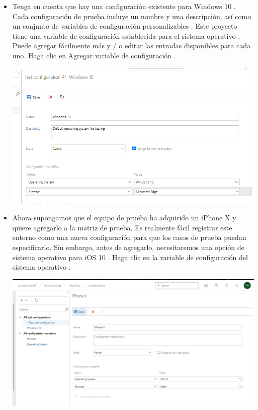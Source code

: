 \begin{itemize}
\item Tenga en cuenta que hay una configuración existente para Windows 10 . Cada configuración de prueba incluye un nombre y una descripción, así como un conjunto de variables de configuración personalizables . Este proyecto tiene una variable de configuración establecida para el sistema operativo . Puede agregar fácilmente más y / o editar las entradas disponibles para cada uno. Haga clic en Agregar variable de configuración .
\begin{center}
\includegraphics[width=\columnwidth]{images/10}\newline
\end{center}
\item Ahora supongamos que el equipo de prueba ha adquirido un iPhone X y quiere agregarlo a la matriz de prueba. Es realmente fácil registrar este entorno como una nueva configuración para que los casos de prueba puedan especificarlo. Sin embargo, antes de agregarlo, necesitaremos una opción de sistema operativo para iOS 10 . Haga clic en la variable de configuración del sistema operativo .
\begin{center}
\includegraphics[width=\columnwidth]{images/13}\newline

\end{center}
\end{itemize}
